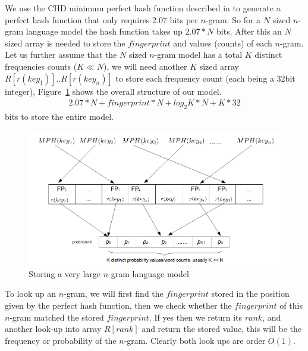 \documentclass[10pt, a4paper]{article}
\begin{document}
We use the CHD minimum perfect hash function described in \cite{CHD-2009} to generate a perfect hash function that only requires $2.07$ bits per $n$-gram.
So for a $N$ sized $n$-gram language model the hash function takes up $2.07*N$ bits.
After this an $N$ sized array is needed to store the $fingerprint$ and values (counts) of each $n$-gram. Let us
further assume that the $N$ sized $n$-gram model has a total $K$ distinct frequencies counts ($K \ll N$),
we will need another $K$ sized array $R[r(key_1)]..R[r(key_n)]$ to store each frequency count (each being a 32bit integer), Figure~\ref{fig:model} shows the overall structure of our model.  
%
\begin{eqnarray}
2.07*N+fingerprint*N+log_2{K}*N+K*32 
\end{eqnarray}
bits to store the entire model.
%
\begin{figure}[tbp]
\centering
\protect\includegraphics[scale=0.35]{pics/model}
\caption{Storing a very large $n$-gram language model}
\label{fig:model}
\end{figure}
%
To look up an $n$-gram, we will first find the $fingerprint$ stored in the position given by the perfect hash function, then we check whether the $fingerprint$ of this $n$-gram matched the stored $fingerprint$. If yes then we return its $rank$, and another look-up into array $R[rank]$ and return the stored value, this will be the frequency or probability of the $n$-gram. Clearly both look ups are order $O(1)$.
\end{document}
